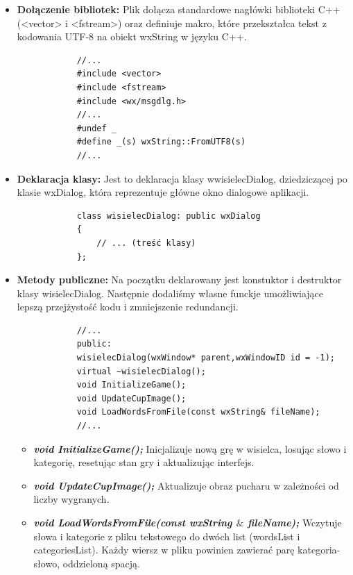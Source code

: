 \documentclass[]{report}
\begin{document}
\begin{itemize}
	
	\item \textbf{Dołączenie bibliotek:} Plik dołącza standardowe nagłówki biblioteki C++ (<vector> i <fstream>) oraz definiuje makro, które przekształca tekst z kodowania UTF-8 na obiekt wxString w języku C++.
	
		\begin{lstlisting}
			//...
			#include <vector>
			#include <fstream>
			#include <wx/msgdlg.h>
			//...
			#undef _
			#define _(s) wxString::FromUTF8(s)
			//...
		\end{lstlisting}
		
	\item \textbf{Deklaracja klasy:} Jest to deklaracja klasy wwisielecDialog, dziedziczącej po klasie wxDialog, która reprezentuje główne okno dialogowe aplikacji.
		
		\begin{lstlisting}
			class wisielecDialog: public wxDialog
			{
				// ... (treść klasy)
			};
		\end{lstlisting}
		
		\item \textbf{Metody publiczne:} Na początku deklarowany jest konstuktor i destruktor klasy wisielecDialog. Następnie dodaliśmy własne funckje umożliwiające lepszą przejżystość kodu i zmniejszenie redundancji.
		
		\begin{lstlisting}
			//...
			public:
			wisielecDialog(wxWindow* parent,wxWindowID id = -1);
			virtual ~wisielecDialog();
			void InitializeGame();
			void UpdateCupImage();
			void LoadWordsFromFile(const wxString& fileName);
			//...
		\end{lstlisting}
\begin{itemize}
		\item \textit{\textbf{void InitializeGame();}} Inicjalizuje nową grę w wisielca, losując słowo i kategorię, resetując stan gry i aktualizując interfejs.
			
		\item \textit{\textbf{void UpdateCupImage();}} Aktualizuje obraz pucharu w zależności od liczby wygranych. 
			
		\item \textit{\textbf{void LoadWordsFromFile(const wxString $\&{}$ fileName);}} Wczytuje słowa i kategorie z pliku tekstowego do dwóch list (wordsList i categoriesList). Każdy wiersz w pliku powinien zawierać parę kategoria-słowo, oddzieloną spacją. 
			

\end{itemize}
\end{itemize}
\end{document}
